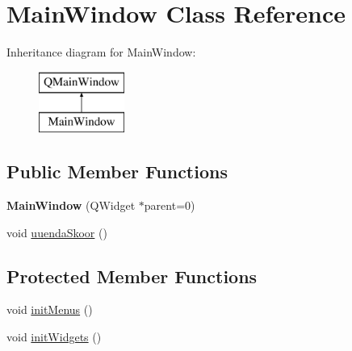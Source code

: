 \hypertarget{class_main_window}{}\section{Main\+Window Class Reference}
\label{class_main_window}
Inheritance diagram for Main\+Window\+:\begin{figure}[H]
\begin{center}
\leavevmode
\includegraphics[height=2.000000cm]{class_main_window}
\end{center}
\end{figure}
\subsection*{Public Member Functions}
\begin{DoxyCompactItemize}
\item 
\mbox{\label{class_main_window_a8b244be8b7b7db1b08de2a2acb9409db}} 
{\bfseries Main\+Window} (Q\+Widget $\ast$parent=0)
\item 
void \mbox{\hyperlink{class_main_window_abc448fe5e16494d3a198018817c38ef6}{uuenda\+Skoor}} ()
\end{DoxyCompactItemize}
\subsection*{Protected Member Functions}
\begin{DoxyCompactItemize}
\item 
void \mbox{\hyperlink{class_main_window_ab15809fe98998fe084f11c87936a9935}{init\+Menus}} ()
\item 
void \mbox{\hyperlink{class_main_window_afcf77332d90edc94daa4d7283c061a90}{init\+Widgets}} ()
\end{DoxyCompactItemize}
